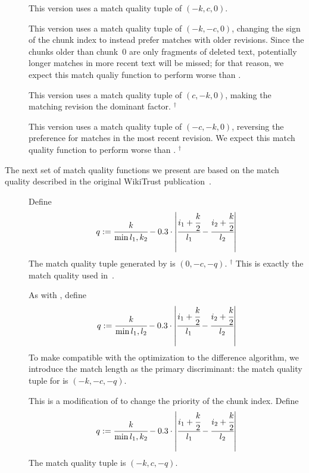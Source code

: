 \begin{description}
\item[]
    This version uses a match quality tuple of $(-k, c, 0)$.

\item[]
    This version uses a match quality tuple of $(-k, -c, 0)$,
    changing the sign of the chunk index to instead prefer
    matches with older revisions.
    Since the chunks older than chunk~0 are only fragments of
    deleted text, potentially longer matches in more recent
    text will be missed; for that reason, we expect this
    match qualiy function to perform worse than .

\item[]
    This version uses a match quality tuple of $(c, -k, 0)$,
    making the matching revision the dominant factor.
    ${}^\dagger$

\item[]
    This version uses a match quality tuple of $(-c, -k, 0)$,
    reversing the preference for matches in the most recent revision.
    We expect this match quality function to perform
    worse than .
    ${}^\dagger$

\end{description}

The next set of match quality functions we present are
based on the match quality described in the
original WikiTrust publication~\cite{Adler2007}.
%
\begin{description}

\item[]
    Define
    \begin{equation*}
    q := \cfrac{k}{\min{l_1, k_2}} - 0.3 \cdot
        \left|\cfrac{ i_1 + \cfrac{k}{2} }{l_1}
            - \cfrac{ i_2 + \cfrac{k}{2} }{l_2} \right|
    \end{equation*}
    The match quality tuple generated by  is $(0, -c, -q)$.
    ${}^\dagger$
    This is exactly the match quality used in~\cite{Adler2007}.

\item[]
    As with , define
    \begin{equation*}
    q := \cfrac{k}{\min{l_1, l_2}} - 0.3 \cdot
        \left|\cfrac{ i_1 + \cfrac{k}{2} }{l_1}
            - \cfrac{ i_2 + \cfrac{k}{2} }{l_2} \right|
    \end{equation*}
    To make  compatible with the 
    optimization to the difference algorithm, we introduce the
    match length as the primary discriminant:
    the match quality tuple for  is $(-k, -c, -q)$.

\item[] This is a modification of 
    to change the priority of the chunk index.
    Define
    \begin{equation*}
    q := \cfrac{k}{\min{l_1, k_2}} - 0.3 \cdot
        \left|\cfrac{ i_1 + \cfrac{k}{2} }{l_1}
            - \cfrac{ i_2 + \cfrac{k}{2} }{l_2} \right|
    \end{equation*}
    The match quality tuple is $(-k, c, -q)$.

\end{description}


